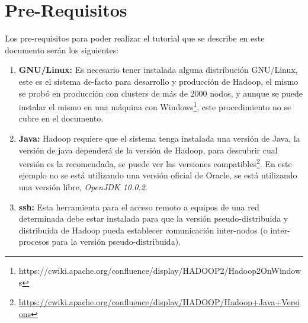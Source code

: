 \section{Pre-Requisitos}
\label{sec:prerequisitos}

Los pre-requisitos para poder realizar el tutorial que se describe en este
documento serán los siguientes:

\begin{enumerate}
\item {\bf GNU/Linux:} Es necesario tener instalada alguna distribución
    GNU/Linux, este es el sistema de-facto para desarrollo y producción
    de Hadoop, el mismo se probó en producción con clusters de más de
    2000 nodos, y aunque se puede instalar el mismo en una máquina con
    Windows\footnote{https://cwiki.apache.org/confluence/display/HADOOP2/Hadoop2OnWindows},
    este procedimiento no se cubre en el documento.
\item {\bf Java:} Hadoop requiere que el sistema tenga instalada una versión de
    Java, la versión de java dependerá de la versión de Hadoop, para descubrir cual
    versión es la recomendada, se puede ver las versiones
    compatibles\footnote{\url{https://cwiki.apache.org/confluence/display/HADOOP/Hadoop+Java+Versions}}.
    En este ejemplo no se está utilizando una versión oficial de Oracle, se está
    utilizando una versión libre, {\it OpenJDK 10.0.2}.
\item {\bf ssh:} Esta herramienta para el acceso remoto a equipos de una red
    determinada debe estar instalada para que la versión
    pseudo-distribuida y distribuida de Hadoop pueda establecer comunicación
    inter-nodos (o inter-procesos para la versión pseudo-distribuida).
\end{enumerate}
